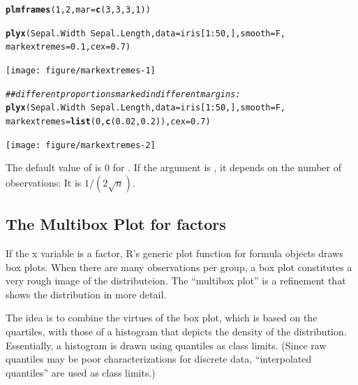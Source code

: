 \documentclass[11pt]{article}\usepackage[]{graphicx}\usepackage[]{color}
\makeatletter
\newcommand{\hlnum}[1]{\textcolor[rgb]{0.686,0.059,0.569}{#1}}%
\newcommand{\hlcom}[1]{\textcolor[rgb]{0.678,0.584,0.686}{\textit{#1}}}%
\newcommand{\hlopt}[1]{\textcolor[rgb]{0,0,0}{#1}}%
\newcommand{\hlstd}[1]{\textcolor[rgb]{0.345,0.345,0.345}{#1}}%
\newcommand{\hlkwc}[1]{\textcolor[rgb]{0.333,0.667,0.333}{#1}}%
\newcommand{\hlkwd}[1]{\textcolor[rgb]{0.737,0.353,0.396}{\textbf{#1}}}%
\newenvironment{kframe}{%
 \def\at@end@of@kframe{}%
 \ifinner\ifhmode%
  \def\at@end@of@kframe{\end{minipage}}%
  \begin{minipage}{\columnwidth}%
 \fi\fi%
 \def\FrameCommand##1{\hskip\@totalleftmargin \hskip-\fboxsep
 \colorbox{shadecolor}{##1}\hskip-\fboxsep
     \hskip-\linewidth \hskip-\@totalleftmargin \hskip\columnwidth}%
 \MakeFramed {\advance\hsize-\width
   \@totalleftmargin\z@ \linewidth\hsize
   \@setminipage}}%
 {\par\unskip\endMakeFramed%
 \at@end@of@kframe}
\newenvironment{knitrout}{}{} %
\makeatother
\begin{document}
\begin{knitrout}
\color{fgcolor}\begin{kframe}
\begin{alltt}
\hlkwd{plmframes}\hlstd{(}\hlnum{1}\hlstd{,}\hlnum{2}\hlstd{,} \hlkwc{mar}\hlstd{=}\hlkwd{c}\hlstd{(}\hlnum{3}\hlstd{,}\hlnum{3}\hlstd{,}\hlnum{3}\hlstd{,}\hlnum{1}\hlstd{))}

\hlkwd{plyx}\hlstd{(Sepal.Width}\hlopt{~}\hlstd{Sepal.Length,} \hlkwc{data}\hlstd{=iris[}\hlnum{1}\hlopt{:}\hlnum{50}\hlstd{,],} \hlkwc{smooth}\hlstd{=F,}
     \hlkwc{markextremes}\hlstd{=}\hlnum{0.1}\hlstd{,} \hlkwc{cex}\hlstd{=}\hlnum{0.7}\hlstd{)}
\end{alltt}
\end{kframe}
\texttt{[image: figure/markextremes-1]} 
\begin{kframe}\begin{alltt}
\hlcom{## different proportions marked in different margins:}
\hlkwd{plyx}\hlstd{(Sepal.Width}\hlopt{~}\hlstd{Sepal.Length,} \hlkwc{data}\hlstd{=iris[}\hlnum{1}\hlopt{:}\hlnum{50}\hlstd{,],} \hlkwc{smooth}\hlstd{=F,}
     \hlkwc{markextremes}\hlstd{=}\hlkwd{list}\hlstd{(}\hlnum{0}\hlstd{,}\hlkwd{c}\hlstd{(}\hlnum{0.02}\hlstd{,}\hlnum{0.2}\hlstd{)),} \hlkwc{cex}\hlstd{=}\hlnum{0.7}\hlstd{)}
\end{alltt}
\end{kframe}
\texttt{[image: figure/markextremes-2]} 

\end{knitrout}
The default value of  is 0 for .
If the argument is , it depends on the number of 
observations: It is $1/(2\sqrt{n})$. 

\subsection{The Multibox Plot for factors}
If the x variable is a factor, R's generic plot function for formula objects
draws box plots.
When there are many observations per group, a box plot constitutes a 
very rough image of the distributeion.
The ``multibox plot'' is a refinement that shows the distribution in more
detail. 

The idea is to combine the virtues of the box plot, which is based on the
quartiles, with those of a histogram that depicts the density of the
distribution. 
Essentially, a histogram is drawn using quantiles as class limits.
(Since raw quantiles may be poor characterizations for discrete data,
``interpolated quantiles'' are used as class limits.)
\end{document}
